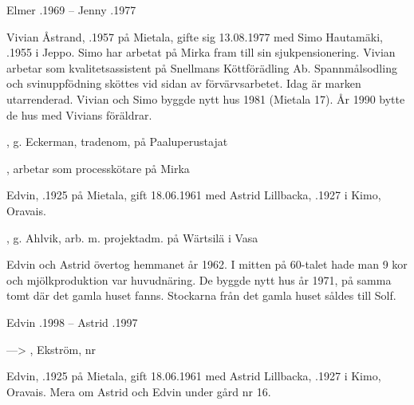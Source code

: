 Elmer .1969  --  Jenny .1977






Vivian Åstrand, .1957 på Mietala, gifte sig 13.08.1977 med Simo Hautamäki, .1955 i Jeppo. Simo har arbetat på Mirka fram till sin sjukpensionering. Vivian arbetar som kvalitetsassistent på Snellmans Köttförädling Ab. Spannmålsodling och  svinuppfödning sköttes vid sidan av förvärvsarbetet. Idag är marken utarrenderad.
Vivian och Simo byggde nytt hus 1981 (Mietala 17). År 1990 bytte de hus med Vivians föräldrar.

\begin{jhchildren}
  \item {}, g. Eckerman, tradenom, på Paaluperustajat
  \item {}, arbetar som processkötare på Mirka
\end{jhchildren}



Edvin, .1925 på Mietala, gift  18.06.1961 med Astrid Lillbacka, .1927 i Kimo, Oravais.
\begin{jhchildren}
  \item {}
  \item {}, g. Ahlvik, arb. m. projektadm. på Wärtsilä i Vasa
\end{jhchildren}

Edvin och Astrid övertog hemmanet år 1962. I mitten på 60-talet hade man 9 kor och mjölkproduktion var huvudnäring. De  byggde nytt hus år 1971, på samma tomt där det gamla huset fanns. Stockarna från det gamla huset såldes till Solf.

Edvin .1998  --  Astrid .1997


--->	, Ekström,  nr 

Edvin, .1925 på Mietala, gift  18.06.1961 med Astrid Lillbacka, .1927 i Kimo, Oravais. Mera om Astrid och Edvin under gård nr 16.\jhvspace{}



